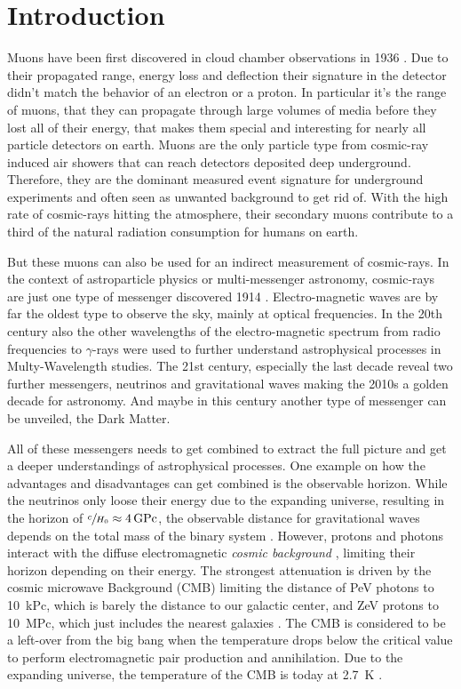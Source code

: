 \chapter{Introduction}

Muons have been first discovered in cloud chamber observations in 1936 \cite{Anderson36Muon}.
Due to their propagated range, energy loss and deflection their signature in the detector didn't match the behavior of an electron or a proton.
In particular it's the range of muons, that they can propagate through large volumes of media before they lost all of their energy, that makes them special and interesting for nearly all particle detectors on earth.
Muons are the only particle type from cosmic-ray induced air showers that can reach detectors deposited deep underground.
Therefore, they are the dominant measured event signature for underground experiments and often seen as unwanted background to get rid of.
With the high rate of cosmic-rays hitting the atmosphere, their secondary muons contribute to a third of the natural radiation consumption for humans on earth.

But these muons can also be used for an indirect measurement of cosmic-rays.
In the context of astroparticle physics or multi-messenger astronomy, cosmic-rays are just one type of messenger discovered 1914 \cite{Hess12CRbirth}.
Electro-magnetic waves are by far the oldest type to observe the sky, mainly at optical frequencies.
In the 20th century also the other wavelengths of the electro-magnetic spectrum from radio frequencies to $\gamma$-rays were used to further understand astrophysical processes in Multy-Wavelength studies.
The 21st century, especially the last decade reveal two further messengers, neutrinos and gravitational waves making the 2010s a golden decade for astronomy.
And maybe in this century another type of messenger can be unveiled, the Dark Matter.

All of these messengers needs to get combined to extract the full picture and get a deeper understandings of astrophysical processes.
One example on how the advantages and disadvantages can get combined is the observable horizon.
While the neutrinos only loose their energy due to the expanding universe, resulting in the horizon of $\sfrac{c}{H_0}\approx\SI{4}{GPc}$, the observable distance for gravitational waves depends on the total mass of the binary system \cite{LIGO20WhitePaper}.
However, protons and photons interact with the diffuse electromagnetic \textit{cosmic background} \cite{Hill18CosmicBg}, limiting their horizon depending on their energy.
The strongest attenuation is driven by the cosmic microwave Background (CMB) limiting the distance of PeV photons to \SI{10}{kPc}, which is barely the distance to our galactic center, and ZeV protons to \SI{10}{MPc}, which just includes the nearest galaxies \cite{DeAngelis13Horizon}.
The CMB is considered to be a left-over from the big bang when the temperature drops below the critical value to perform electromagnetic pair production and annihilation.
Due to the expanding universe, the temperature of the CMB is today at \SI{2.7}{K} \cite{PDG20}.

